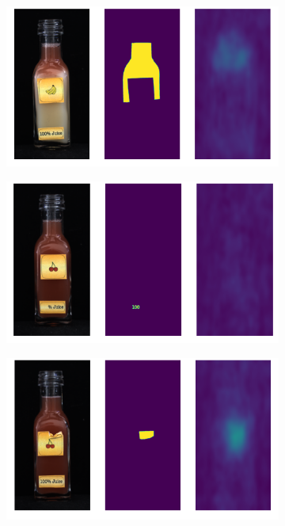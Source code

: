 \begin{figure}[htbp]
\begin{subfigure}[b]{0.3\textwidth}
    \end{subfigure}
    \begin{subfigure}[b]{0.3\textwidth}
        \centering
        \includegraphics[width=\textwidth]{figures/locosimplenetresults/JB/image_prediction_286.png}

    \end{subfigure}
    \begin{subfigure}[b]{0.3\textwidth}
        \centering
        \includegraphics[width=\textwidth]{figures/locosimplenetresults/JB/image_prediction_297.png}

    \end{subfigure}
    \begin{subfigure}[b]{0.3\textwidth}
        \centering
        \includegraphics[width=\textwidth]{figures/locosimplenetresults/JB/image_prediction_300.png}


\end{subfigure}
\end{figure}

